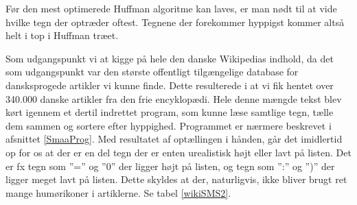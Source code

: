 

Før den mest optimerede Huffman algoritme kan laves, er man nødt til at vide hvilke tegn der optræder oftest. Tegnene der forekommer hyppigst kommer altså helt i top i Huffman træet.

Som udgangspunkt vi at kigge på hele den danske Wikipedias indhold, da det som udgangspunkt var den største offentligt tilgængelige database for dansksprogede artikler vi kunne finde. Dette resulterede i at vi fik hentet over 340.000 danske artikler fra den frie encyklopædi. Hele denne mængde tekst blev kørt igennem et dertil indrettet program, som kunne læse samtlige tegn, tælle dem sammen og sortere efter hyppighed. Programmet er nærmere beskrevet i afsnittet \ref{SmaaProg}.  Med resultatet af optællingen i hånden, går det imidlertid op for os at der er en del tegn der er enten urealistisk højt eller lavt på listen. Det er fx tegn som ”=” og ”0” der ligger højt på listen, og tegn som ”:” og ”)” der ligger meget lavt på listen. Dette skyldes at der, naturligvis, ikke bliver brugt ret mange humørikoner i artiklerne. Se tabel \ref{wikiSMS2}.

